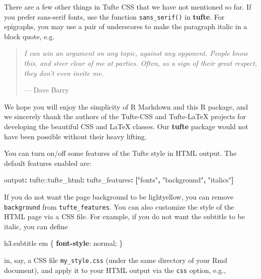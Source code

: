 \documentclass[]{tufte-handout}
\newenvironment{Shaded}{}{}
\newcommand{\AttributeTok}[1]{\textcolor[rgb]{0.49,0.56,0.16}{#1}}
\newcommand{\DecValTok}[1]{\textcolor[rgb]{0.25,0.63,0.44}{#1}}
\newcommand{\FunctionTok}[1]{\textcolor[rgb]{0.02,0.16,0.49}{#1}}
\newcommand{\KeywordTok}[1]{\textcolor[rgb]{0.00,0.44,0.13}{\textbf{#1}}}
\newcommand{\NormalTok}[1]{#1}
\newcommand{\OperatorTok}[1]{\textcolor[rgb]{0.40,0.40,0.40}{#1}}
\newcommand{\StringTok}[1]{\textcolor[rgb]{0.25,0.44,0.63}{#1}}
\begin{document}
There are a few other things in Tufte CSS that we have not mentioned so
far. If you prefer \textsf{sans-serif fonts}, use the function
\texttt{sans\_serif()} in \textbf{tufte}. For epigraphs, you may use a
pair of underscores to make the paragraph italic in a block quote, e.g.

\begin{quote}
\emph{I can win an argument on any topic, against any opponent. People
know this, and steer clear of me at parties. Often, as a sign of their
great respect, they don't even invite me.}

\hfill --- Dave Barry
\end{quote}

We hope you will enjoy the simplicity of R Markdown and this R package,
and we sincerely thank the authors of the Tufte-CSS and Tufte-LaTeX
projects for developing the beautiful CSS and LaTeX classes. Our
\textbf{tufte} package would not have been possible without their heavy
lifting.

You can turn on/off some features of the Tufte style in HTML output. The
default features enabled are:

\begin{Shaded}
\begin{Highlighting}[]
\FunctionTok{output}\KeywordTok{:}
\AttributeTok{  tufte:}\FunctionTok{:tufte\_html}\KeywordTok{:}
\AttributeTok{    }\FunctionTok{tufte\_features}\KeywordTok{:}\AttributeTok{ }\KeywordTok{[}\StringTok{"fonts"}\KeywordTok{,}\AttributeTok{ }\StringTok{"background"}\KeywordTok{,}\AttributeTok{ }\StringTok{"italics"}\KeywordTok{]}
\end{Highlighting}
\end{Shaded}

If you do not want the page background to be lightyellow, you can remove
\texttt{background} from \texttt{tufte\_features}. You can also
customize the style of the HTML page via a CSS file. For example, if you
do not want the subtitle to be italic, you can define

\begin{Shaded}
\begin{Highlighting}[]
\NormalTok{h3}\FunctionTok{.subtitle}\NormalTok{ em \{}
  \KeywordTok{font{-}style}\NormalTok{: }\DecValTok{normal}\OperatorTok{;}
\NormalTok{\}}
\end{Highlighting}
\end{Shaded}

in, say, a CSS file \texttt{my\_style.css} (under the same directory of
your Rmd document), and apply it to your HTML output via the
\texttt{css} option, e.g.,
\end{document}
